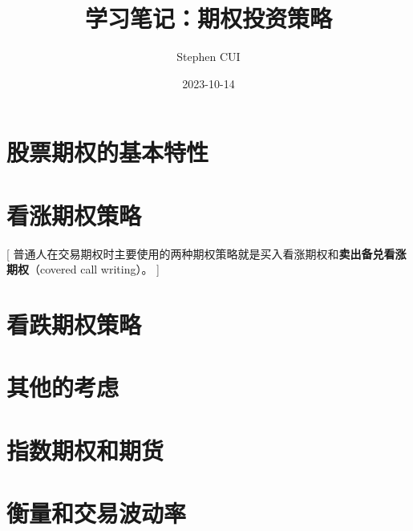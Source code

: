 \documentclass{book}
\title{学习笔记：期权投资策略}
\author{Stephen CUI}
\date{2023-10-14}
\begin{document}
\maketitle
\frontmatter
\tableofcontents
\mainmatter
\part{股票期权的基本特性}

\part{看涨期权策略}[
    普通人在交易期权时主要使用的两种期权策略就是买入看涨期权和\textbf{卖出备兑看涨期权}（covered call writing）。
]

\part{看跌期权策略}
\part{其他的考虑}
\part{指数期权和期货}
\part{衡量和交易波动率}
\end{document}
